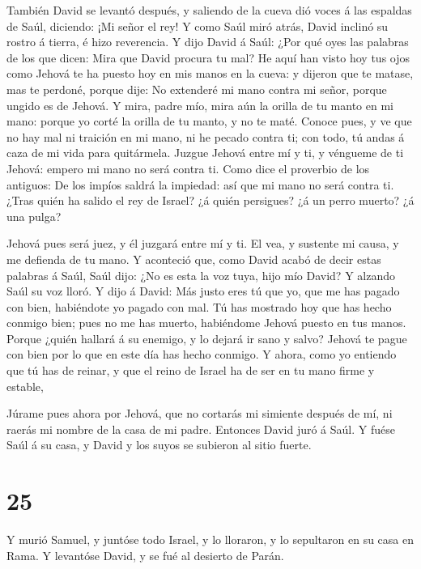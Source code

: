  También David se levantó después, y saliendo de la cueva
dió voces á las espaldas de Saúl, diciendo: ¡Mi señor el rey! Y como
Saúl miró atrás, David inclinó su rostro á tierra, é hizo reverencia.
 Y dijo David á Saúl: ¿Por qué oyes las palabras de los que
dicen: Mira que David procura tu mal?  He aquí han visto
hoy tus ojos como Jehová te ha puesto hoy en mis manos en la cueva: y
dijeron que te matase, mas te perdoné, porque dije: No extenderé mi mano
contra mi señor, porque ungido es de Jehová.  Y mira, padre
mío, mira aún la orilla de tu manto en mi mano: porque yo corté la
orilla de tu manto, y no te maté. Conoce pues, y ve que no hay mal ni
traición en mi mano, ni he pecado contra ti; con todo, tú andas á caza
de mi vida para quitármela.  Juzgue Jehová entre mí y ti, y
véngueme de ti Jehová: empero mi mano no será contra ti. 
Como dice el proverbio de los antiguos: De los impíos saldrá la
impiedad: así que mi mano no será contra ti.  ¿Tras quién
ha salido el rey de Israel? ¿á quién persigues? ¿á un perro muerto? ¿á
una pulga?

 Jehová pues será juez, y él juzgará entre mí y ti. El vea,
y sustente mi causa, y me defienda de tu mano.  Y aconteció
que, como David acabó de decir estas palabras á Saúl, Saúl dijo: ¿No es
esta la voz tuya, hijo mío David? Y alzando Saúl su voz lloró.
 Y dijo á David: Más justo eres tú que yo, que me has
pagado con bien, habiéndote yo pagado con mal.  Tú has
mostrado hoy que has hecho conmigo bien; pues no me has muerto,
habiéndome Jehová puesto en tus manos.  Porque ¿quién
hallará á su enemigo, y lo dejará ir sano y salvo? Jehová te pague con
bien por lo que en este día has hecho conmigo.  Y ahora,
como yo entiendo que tú has de reinar, y que el reino de Israel ha de
ser en tu mano firme y estable,

 Júrame pues ahora por Jehová, que no cortarás mi simiente
después de mí, ni raerás mi nombre de la casa de mi padre. Entonces
David juró á Saúl. Y fuése Saúl á su casa, y David y los suyos se
subieron al sitio fuerte.

\hypertarget{section-24}{%
\section{25}\label{section-24}}

 Y murió Samuel, y juntóse todo Israel, y lo lloraron, y lo
sepultaron en su casa en Rama. Y levantóse David, y se fué al desierto
de Parán.

